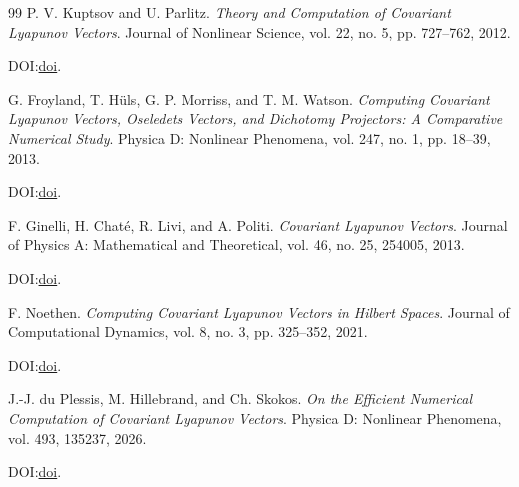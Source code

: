 \documentclass[11pt]{article}
\begin{document}
\begin{thebibliography}{99}
P. V. Kuptsov and U. Parlitz.
\emph{Theory and Computation of Covariant Lyapunov Vectors}.
Journal of Nonlinear Science, vol. 22, no. 5, pp. 727--762, 2012.
\par\noindent DOI:\@ \href{https://doi.org/10.1007/s00332-012-9126-5}{doi}.

G. Froyland, T. H\"{u}ls, G. P. Morriss, and T. M. Watson.
\emph{Computing Covariant Lyapunov Vectors, Oseledets Vectors, and Dichotomy Projectors: A Comparative Numerical Study}.
Physica D: Nonlinear Phenomena, vol. 247, no. 1, pp. 18--39, 2013.
\par\noindent DOI:\@ \href{https://doi.org/10.1016/j.physd.2012.12.005}{doi}.

F. Ginelli, H. Chat\'{e}, R. Livi, and A. Politi.
\emph{Covariant Lyapunov Vectors}.
Journal of Physics A: Mathematical and Theoretical, vol. 46, no. 25,
254005, 2013.
\par\noindent DOI:\@ \href{https://doi.org/10.1088/1751-8113/46/25/254005}{doi}.

F. Noethen.
\emph{Computing Covariant Lyapunov Vectors in Hilbert Spaces}.
Journal of Computational Dynamics, vol. 8, no. 3, pp. 325--352, 2021.
\par\noindent DOI:\@ \href{https://doi.org/10.3934/jcd.2021014}{doi}.

J.-J. du Plessis, M. Hillebrand, and Ch. Skokos.
\emph{On the Efficient Numerical Computation of Covariant Lyapunov Vectors}.
Physica D: Nonlinear Phenomena, vol. 493, 135237, 2026.
\par\noindent DOI:\@ \href{https://doi.org/10.1016/j.physd.2026.135237}{doi}.

\end{thebibliography}
\end{document}
